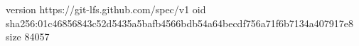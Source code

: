 version https://git-lfs.github.com/spec/v1
oid sha256:01c46856843c52d5435a5bafb4566bdb54a64becdf756a71f6b7134a407917e8
size 84057
